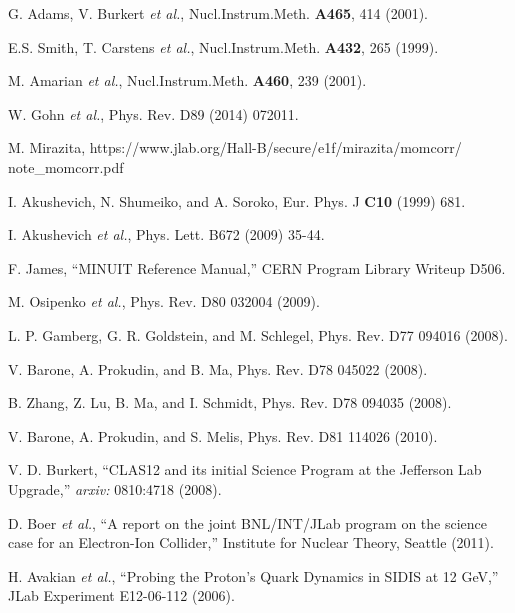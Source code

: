 \begin{thebibliography}{99}
	G. Adams, V. Burkert \emph{et al.}, Nucl.Instrum.Meth. \textbf{A465}, 414 (2001).

	E.S. Smith, T. Carstens \emph{et al.}, Nucl.Instrum.Meth. \textbf{A432}, 265 (1999).

	M. Amarian \emph{et al.}, Nucl.Instrum.Meth. \textbf{A460}, 239 (2001).

	W. Gohn \emph{et al.}, Phys. Rev. D89 (2014) 072011.

	M. Mirazita, https://www.jlab.org/Hall-B/secure/e1f/mirazita/momcorr/\\note\_momcorr.pdf

	I. Akushevich, N. Shumeiko, and A. Soroko, Eur. Phys. J \textbf{C10} (1999) 681.

	I. Akushevich \emph{et al.}, Phys. Lett. B672 (2009) 35-44.

	F. James, ``MINUIT Reference Manual,'' CERN Program Library Writeup D506.

	M. Osipenko \emph{et al.}, Phys. Rev. D80 032004 (2009).

	L. P. Gamberg, G. R. Goldstein, and M. Schlegel, Phys. Rev. D77 094016 (2008).

	V. Barone, A. Prokudin, and B. Ma, Phys. Rev. D78 045022 (2008).

	B. Zhang, Z. Lu, B. Ma, and I. Schmidt, Phys. Rev. D78 094035 (2008).

	V. Barone, A. Prokudin, and S. Melis, Phys. Rev. D81 114026 (2010).

	V. D. Burkert, ``CLAS12 and its initial Science Program at the Jefferson Lab Upgrade,'' \emph{arxiv:} 0810:4718 (2008).

	D. Boer \emph{et al.}, ``A report on the joint BNL/INT/JLab program on the science case for an Electron-Ion Collider,''
	Institute for Nuclear Theory, Seattle (2011).

	H. Avakian \emph{et al.}, ``Probing the Proton's Quark Dynamics in SIDIS at 12 GeV,'' JLab Experiment E12-06-112 (2006).

\end{thebibliography}

